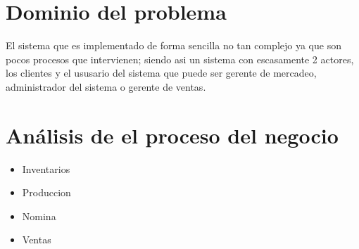 \section{Dominio del problema}
El sistema que es implementado de forma sencilla no tan complejo ya que son pocos procesos que intervienen; siendo asi un sistema con escasamente 2 actores, los clientes y el ususario del sistema que puede ser gerente de mercadeo, administrador del sistema o gerente de ventas.%
%
%
%
%
\section{An\'alisis de el proceso del negocio}
	\begin{itemize}
		\item Inventarios
		\item Produccion
		\item Nomina
		\item Ventas
	\end{itemize}
